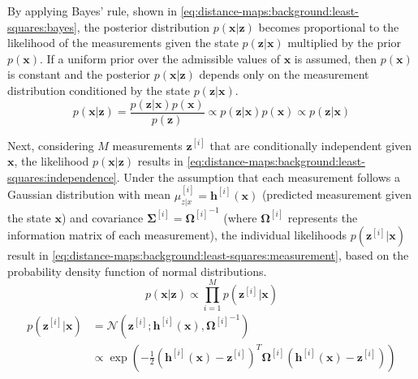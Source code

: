 By applying Bayes' rule, shown in
\eqref{eq:distance-maps:background:least-squares:bayes}, the posterior
distribution $p(\mathbf{x}|\mathbf{z})$ becomes proportional to
the likelihood of the measurements given the state
$p(\mathbf{z}|\mathbf{x})$ multiplied by the prior $p(\mathbf{x})$.
If a uniform prior over the admissible values of $\mathbf{x}$ is assumed,
then $p(\mathbf{x})$ is constant and the
posterior $p(\mathbf{x}|\mathbf{z})$ depends only on the measurement
distribution conditioned by the state $p(\mathbf{z}|\mathbf{x})$.
\begin{equation}\label{eq:distance-maps:background:least-squares:bayes}
p(\mathbf{x}|\mathbf{z}) =
\frac{p(\mathbf{z}|\mathbf{x})p(\mathbf{x})}{p(\mathbf{z})}
\propto p(\mathbf{z}|\mathbf{x})p(\mathbf{x})
\propto p(\mathbf{z}|\mathbf{x})
\end{equation}

Next, considering $M$ measurements $\mathbf{z}^{[i]}$ that are
conditionally independent given $\mathbf{x}$, the likelihood
$p(\mathbf{x}|\mathbf{z})$ results in
\eqref{eq:distance-maps:background:least-squares:independence}.
Under the assumption that each measurement follows a Gaussian distribution
with mean $\mu_{z|x}^{[i]}=\mathbf{h}^{[i]}(\mathbf{x})$
(predicted measurement given the state $\mathbf{x}$) and covariance
$\mathbf{\Sigma}^{[i]} = {\mathbf{\Omega}^{[i]}}^{-1}$ (where
$\mathbf{\Omega}^{[i]}$ represents the information matrix of each measurement),
the individual likelihoods $p(\mathbf{z}^{[i]}|\mathbf{x})$ result in
\eqref{eq:distance-maps:background:least-squares:measurement}, based on the
probability density function of normal distributions.
\begin{equation}\label{eq:distance-maps:background:least-squares:independence}
p(\mathbf{x}|\mathbf{z}) \propto \prod_{i=1}^M p(\mathbf{z}^{[i]}|\mathbf{x})
\end{equation}
\begin{equation}\label{eq:distance-maps:background:least-squares:measurement}
\begin{aligned}
p(\mathbf{z}^{[i]}|\mathbf{x})
  & = \mathcal{N}(\mathbf{z}^{[i]} ; \mathbf{h}^{[i]}(\mathbf{x}),
                                    {\mathbf{\Omega}^{[i]}}^{-1})\\
  & \propto \exp\!\left(
      -\frac{1}{2}
      \left( \mathbf{h}^{[i]}(\mathbf{x}) - \mathbf{z}^{[i]} \right)^T
      \mathbf{\Omega}^{[i]}
      \left( \mathbf{h}^{[i]}(\mathbf{x}) - \mathbf{z}^{[i]} \right)
  \right)
\end{aligned}
\end{equation}

